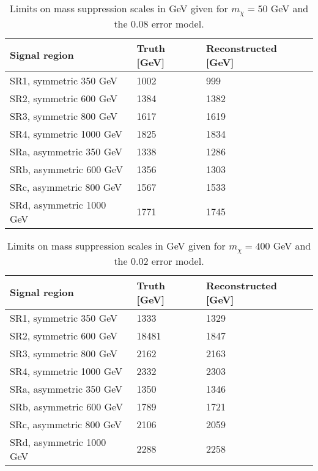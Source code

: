 \begin{table}[ht]
\begin{center}
\begin{tabular}{|l|l|l|}
\hline
Signal region & Truth [GeV]& Reconstructed [GeV]\\ \hline
SR1, symmetric 350 GeV&1002&999\\
SR2, symmetric 600 GeV&1384&1382\\
SR3, symmetric 800 GeV&1617&1619\\
SR4, symmetric 1000 GeV&1825&1834\\ \hline
SRa, asymmetric 350 GeV&1338&1286\\
SRb, asymmetric 600 GeV&1356&1303\\
SRc, asymmetric 800 GeV&1567&1533\\
SRd, asymmetric 1000 GeV&1771&1745\\ \hline
\end{tabular}
\caption{Limits on mass suppression scales in GeV given for $m_{\chi}=50$ GeV and the 0.08 error model.}
\label{tab:masssupp010}
\end{center}
\end{table}

\begin{table}[ht!]
\begin{center}
\begin{tabular}{|l|l|l|}
\hline
Signal region & Truth [GeV]& Reconstructed [GeV]\\ \hline
SR1, symmetric 350 GeV &1333&1329\\
SR2, symmetric 600 GeV&18481&1847\\
SR3, symmetric 800 GeV&2162&2163\\
SR4, symmetric 1000 GeV&2332&2303\\ \hline
SRa, asymmetric 350 GeV&1350&1346\\
SRb, asymmetric 600 GeV&1789&1721\\
SRc, asymmetric 800 GeV&2106&2059\\
SRd, asymmetric 1000 GeV&2288&2258\\ \hline
\end{tabular}
\caption{Limits on mass suppression scales in GeV given for $m_{\chi}=400$ GeV and the 0.02 error model.}
\label{tab:masssupp2002}
\end{center}
\end{table}


